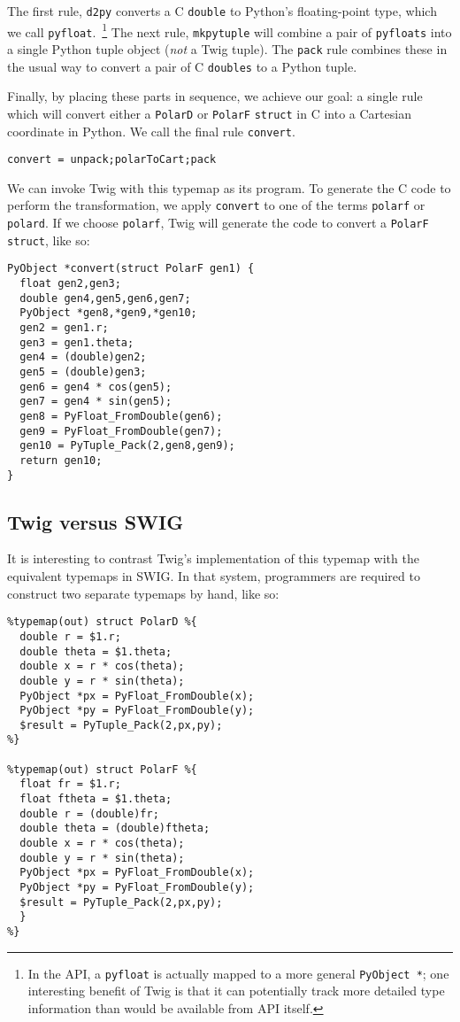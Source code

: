 The first rule, \texttt{d2py} converts a C \texttt{double} to
Python's floating-point type, which we call
\texttt{pyfloat}.~\footnote{In the API, a \texttt{pyfloat} is
actually mapped to a more general \texttt{PyObject *}; one
interesting benefit of Twig is that it can potentially track more
detailed type information than would be available from API
itself.} The next rule, \texttt{mkpytuple} will combine a pair of
\texttt{pyfloats} into a single Python tuple object (\emph{not} a
Twig tuple). The \texttt{pack} rule combines these in the usual
way to convert a pair of C \texttt{doubles} to a Python tuple.

Finally, by placing these parts in sequence, we achieve our goal: a single rule which will convert either a \texttt{PolarD} or \texttt{PolarF} \texttt{struct} in C into a Cartesian coordinate  in Python. We call the final rule \texttt{convert}.

\begin{verbatim}
convert = unpack;polarToCart;pack
\end{verbatim}

We can invoke Twig with this typemap as its program. To generate the C code to perform the transformation, we apply \texttt{convert} to one of the terms \texttt{polarf} or \texttt{polard}. If we choose \texttt{polarf}, Twig will generate the code to convert a \texttt{PolarF} \texttt{struct}, like so:

\begin{verbatim}
PyObject *convert(struct PolarF gen1) {
  float gen2,gen3;
  double gen4,gen5,gen6,gen7;
  PyObject *gen8,*gen9,*gen10;
  gen2 = gen1.r;
  gen3 = gen1.theta;
  gen4 = (double)gen2;
  gen5 = (double)gen3;
  gen6 = gen4 * cos(gen5);  
  gen7 = gen4 * sin(gen5);
  gen8 = PyFloat_FromDouble(gen6);
  gen9 = PyFloat_FromDouble(gen7);
  gen10 = PyTuple_Pack(2,gen8,gen9);
  return gen10;
}
\end{verbatim}

\subsection{Twig versus SWIG}

It is interesting to contrast Twig's implementation of this typemap with the equivalent typemaps in SWIG. In that system, programmers are required to construct two separate typemaps by hand, like so:

\begin{verbatim}
%typemap(out) struct PolarD %{
  double r = $1.r;
  double theta = $1.theta;
  double x = r * cos(theta);
  double y = r * sin(theta);
  PyObject *px = PyFloat_FromDouble(x);
  PyObject *py = PyFloat_FromDouble(y);
  $result = PyTuple_Pack(2,px,py);
%}

%typemap(out) struct PolarF %{
  float fr = $1.r;
  float ftheta = $1.theta;
  double r = (double)fr;
  double theta = (double)ftheta;
  double x = r * cos(theta);
  double y = r * sin(theta);
  PyObject *px = PyFloat_FromDouble(x);
  PyObject *py = PyFloat_FromDouble(y);
  $result = PyTuple_Pack(2,px,py);
  }
%}
\end{verbatim}

